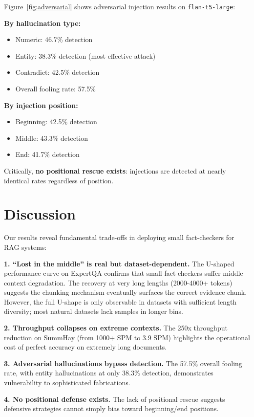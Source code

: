 \documentclass{article}
\begin{document}
Figure~\ref{fig:adversarial} shows adversarial injection results on \texttt{flan-t5-large}:

\textbf{By hallucination type:}
\begin{itemize}
    \item Numeric: 46.7\% detection
    \item Entity: 38.3\% detection (most effective attack)
    \item Contradict: 42.5\% detection
    \item Overall fooling rate: 57.5\%
\end{itemize}

\textbf{By injection position:}
\begin{itemize}
    \item Beginning: 42.5\% detection
    \item Middle: 43.3\% detection
    \item End: 41.7\% detection
\end{itemize}

Critically, \textbf{no positional rescue exists}: injections are detected at nearly identical rates regardless of position.

\section{Discussion}

Our results reveal fundamental trade-offs in deploying small fact-checkers for RAG systems:

\textbf{1. ``Lost in the middle'' is real but dataset-dependent.} The U-shaped performance curve on ExpertQA confirms that small fact-checkers suffer middle-context degradation. The recovery at very long lengths (2000-4000+ tokens) suggests the chunking mechanism eventually surfaces the correct evidence chunk. However, the full U-shape is only observable in datasets with sufficient length diversity; most natural datasets lack samples in longer bins.

\textbf{2. Throughput collapses on extreme contexts.} The 250x throughput reduction on SummHay (from 1000+ SPM to 3.9 SPM) highlights the operational cost of perfect accuracy on extremely long documents.

\textbf{3. Adversarial hallucinations bypass detection.} The 57.5\% overall fooling rate, with entity hallucinations at only 38.3\% detection, demonstrates vulnerability to sophisticated fabrications.

\textbf{4. No positional defense exists.} The lack of positional rescue suggests defensive strategies cannot simply bias toward beginning/end positions.
\end{document}
